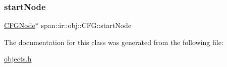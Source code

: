 \subsubsection{\texorpdfstring{start\+Node}{startNode}}
{\footnotesize\ttfamily \hyperlink{classspan_1_1ir_1_1obj_1_1CFGNode}{C\+F\+G\+Node}$\ast$ span\+::ir\+::obj\+::\+C\+F\+G\+::start\+Node\hspace{0.3cm}{\ttfamily [private]}}



The documentation for this class was generated from the following file\+:\begin{DoxyCompactItemize}
\item 
\hyperlink{objects_8h}{objects.\+h}\end{DoxyCompactItemize}
